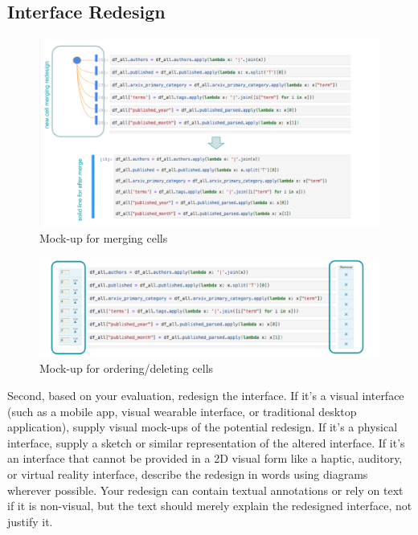 \documentclass[12pt,letterpaper]{article}
\begin{document}
\subsection*{Interface Redesign}

\begin{figure}[h]
\centering
\includegraphics[scale=.6]{figures/project-principles/cell_merge.png}
\caption{Mock-up for merging cells}
\label{fig::2}
\end{figure}

\begin{figure}[h]
\centering
\includegraphics[scale=.6]{figures/project-principles/cell_create.png}
\caption{Mock-up for ordering/deleting cells}
\label{fig::3}
\end{figure}

Second, based on your evaluation, redesign the interface. If it’s a visual interface (such as a mobile app, visual wearable interface, or traditional desktop application), supply visual mock-ups of the potential redesign. If it’s a physical interface, supply a sketch or similar representation of the altered interface. If it’s an interface that cannot be provided in a 2D visual form like a haptic, auditory, or virtual reality interface, describe the redesign in words using diagrams wherever possible. Your redesign can contain textual annotations or rely on text if it is non-visual, but the text should merely explain the redesigned interface, not justify it.
\end{document}
